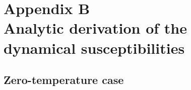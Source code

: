 %
%
%
%
%
%
%
\appendix
\chapter*{Appendix B\\Analytic derivation of the dynamical susceptibilities}  
\label{sec:Los.vs.Fid}

\section*{Zero-temperature case}

